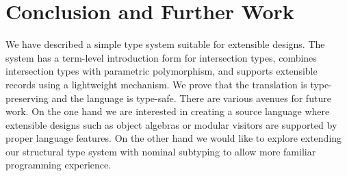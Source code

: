 \section{Conclusion and Further Work}

We have described a simple type system suitable for extensible designs.
 The system has a term-level
introduction form for intersection types, combines intersection types with
parametric polymorphism, and supports extensible records using a lightweight
mechanism. We prove that the translation is type-preserving and the language is
type-safe. There are various avenues for future work. On the one hand we are
interested in creating a source language where extensible designs such as object
algebras or modular visitors are supported by proper language features. On the
other hand we would like to explore extending our structural type system with
nominal subtyping to allow more familiar programming experience.
